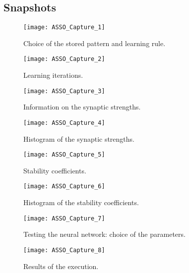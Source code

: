 \subsection{Snapshots}
\begin{figure}[h!t]
\centering
\texttt{[image: ASSO\_Capture\_1]}
\caption{Choice of the stored pattern and learning rule.}\label{ASSO_Capture_1}
\end{figure}
\begin{figure}[h!t]
\centering
\texttt{[image: ASSO\_Capture\_2]}
\caption{Learning iterations.}\label{ASSO_Capture_2}
\end{figure}
\begin{figure}[h!t]
\centering
\texttt{[image: ASSO\_Capture\_3]}
\caption{Information on the synaptic strengths.}\label{ASSO_Capture_3}
\end{figure}
\begin{figure}[h!t]
\centering
\texttt{[image: ASSO\_Capture\_4]}
\caption{Histogram of the synaptic strengths.}\label{ASSO_Capture_4}
\end{figure}
\begin{figure}[h!t]
\centering
\texttt{[image: ASSO\_Capture\_5]}
\caption{Stability coefficients.}\label{ASSO_Capture_5}
\end{figure}
\begin{figure}[h!t]
\centering
\texttt{[image: ASSO\_Capture\_6]}
\caption{Histogram of the stability coefficients.}\label{ASSO_Capture_6}
\end{figure}
\begin{figure}[h!t]
\centering
\texttt{[image: ASSO\_Capture\_7]}
\caption{Testing the neural network: choice of the parameters.}\label{ASSO_Capture_7}
\end{figure}
\begin{figure}[h!t]
\centering
\texttt{[image: ASSO\_Capture\_8]}
\caption{Results of the execution.}\label{ASSO_Capture_8}
\end{figure}
\clearpage

